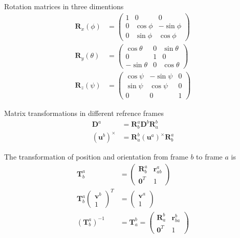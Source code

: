 Rotation matrices in three dimentions
\begin{align*}
    \bm{R}_x(\phi) &= \begin{pmatrix}
        1 & 0 & 0 \\
        0 & \cos \phi & -\sin \phi \\
        0 & \sin \phi & \cos \phi
    \end{pmatrix}\\
    \bm{R}_y(\theta) &= \begin{pmatrix}
        \cos \theta & 0 & \sin \theta \\
        0 & 1 & 0 \\
        -\sin \theta & 0 & \cos \theta
    \end{pmatrix}\\
    \bm{R}_z(\psi) &= \begin{pmatrix}
        \cos \psi & -\sin \psi & 0 \\
        \sin \psi & \cos \psi & 0 \\
        0 & 0 & 1
    \end{pmatrix}
\end{align*}

Matrix transformations in different refrence frames
\begin{align*}
    \bm{D}^a &= \bm{R}_b^a\bm{D}^b\bm{R}_a^b \\
    (\bm{u}^b)^\times &= \bm{R}_a^b (\bm{u}^a)^\times \bm{R}_b^a
\end{align*}

The transformation of position and orientation from frame \(\mathit{b}\) to frame \(\mathit{a}\) is
\begin{align*}
    \bm{T}_b^a &= \begin{pmatrix}
        \bm{R}_b^a & \bm{r}_{ab}^a \\
        \bm{0}^T & 1
    \end{pmatrix} \\
    \bm{T}_b^a \begin{pmatrix}\bm{v}^b \\ 1\end{pmatrix}^T &= \begin{pmatrix}\bm{v}^a \\ 1\end{pmatrix}  \\
    (\bm{T}_b^a)^{-1} &= \bm{T}_a^b = \begin{pmatrix}
        \bm{R}_a^b & \bm{r}_{ba}^b \\
        \bm{0}^T & 1
    \end{pmatrix}
\end{align*}

